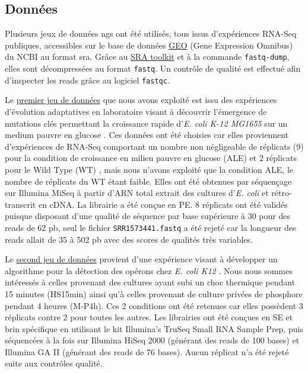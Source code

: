 \documentclass[12pt,a4paper]{report}
\begin{document}
\begin{onehalfspace}
\section*{Données}
Plusieurs jeux de données \gls{ngs} ont été utilisés, tous issus d'expériences RNA-Seq publiques, accessibles sur le base de données \href{http://www.ncbi.nlm.nih.gov/geo/}{GEO} (Gene Expression Omnibus) du NCBI au format \gls{sra}. Grâce au \href{http://www.ncbi.nlm.nih.gov/books/NBK158900/#SRA_download.how_do_i_use_the_sra_toolki}{SRA toolkit} et à la commande \texttt{fastq-dump}, elles sont décompressées au format \texttt{fastq}. Un contrôle de qualité est effectué afin d'inspecter les \gls{reads} grâce au logiciel \texttt{fastqc}.

Le \href{http://www.ncbi.nlm.nih.gov/geo/query/acc.cgi?acc=GSE61327}{premier jeu de données} que nous avons exploité est issu des expériences d'évolution adaptatives en laboratoire visant à découvrir l'émergence de mutations clés permettant la croissance rapide d'\textit{E. coli K-12 MG1655} sur un medium pauvre en glucose \citep{Lacroix2014}. Ces données ont été choisies car elles proviennent d'expériences de RNA-Seq comportant un nombre non négligeable de réplicats (9) pour la condition de croissance en milieu pauvre en glucose (ALE) et 2 réplicats pour le Wild Type (WT) , mais nous n'avons exploité que la condition ALE, le nombre de réplicats du WT étant faible. Elles ont été obtenues par séquençage sur Illumina MiSeq à partir d'ARN total extrait des cultures d'\textit{E. coli} et rétro-transcrit en cDNA. La librairie a été conçue en \gls{PE}. 8 réplicats ont été validés puisque disposant d'une qualité de séquence par base supérieure à 30 pour des reads de 62 pb, seul le fichier \texttt{SRR1573441.fastq} a été rejeté car la longueur des reads allait de 35 à 502 pb avec des scores de qualités très variables.

Le \href{http://bioinfolab.uncc.edu/TruHmm_package/raw_data/}{second jeu de données} provient d'une expérience visant à développer un algorithme pour la détection des opérons chez \textit{E. coli K12} \citep{Li2013}. Nous nous sommes intéressés à celles provenant des cultures ayant subi un choc thermique pendant 15 minutes (HS15min) ainsi qu'à celles provenant de culture privées de phosphore pendant 4 heures (M-P4h). Ces 2 conditions ont été retenues car elles possèdent 3 réplicats contre 2 pour toutes les autres. Les librairies ont été conçues en \gls{SE} et brin spécifique en utilisant le kit Illumina’s TruSeq Small RNA Sample Prep, puis séquencées à la fois sur Illumina HiSeq 2000 (générant des reads de 100 bases) et Illumina GA II (générant des reads de 76 bases). Aucun réplicat n'a été rejeté suite aux contrôles qualité.


\end{onehalfspace}
\end{document}
